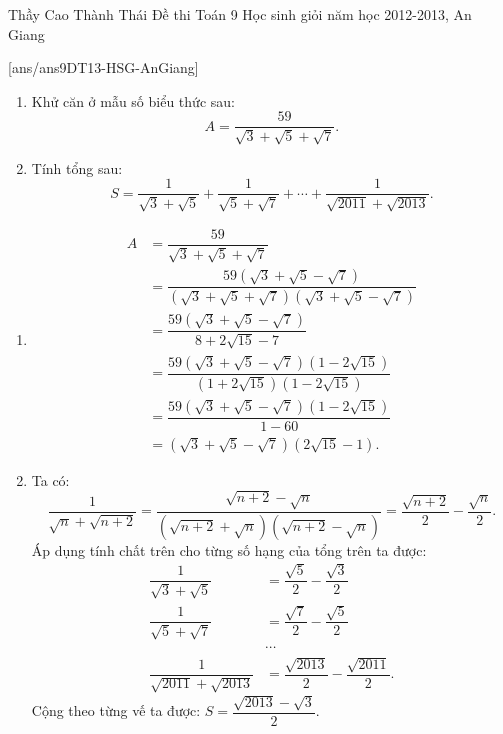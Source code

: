 \begin{name}
{Thầy Cao Thành Thái}
{Đề thi Toán 9 Học sinh giỏi năm học 2012-2013, An Giang}
\end{name}
\setcounter{ex}{0}
[ans/ans9DT13-HSG-AnGiang]


\begin{ex}%
\textrm{}
 \begin{enumerate}
  \item Khử căn ở mẫu số biểu thức sau:
  $$A = \dfrac{59}{\sqrt{3} + \sqrt{5} + \sqrt{7}}.$$
  \item Tính tổng sau:
  $$S = \dfrac{1}{\sqrt{3} + \sqrt{5}} + \dfrac{1}{\sqrt{5} + \sqrt{7}} + \cdots + \dfrac{1}{\sqrt{2011} + \sqrt{2013}}.$$
 \end{enumerate}
 \loigiai
 {
 \begin{enumerate}
  \item \textrm{ }
  \begin{align*}
  A & = \dfrac{59}{\sqrt{3} + \sqrt{5} + \sqrt{7}} \\
    & = \dfrac{59 \left( \sqrt{3} + \sqrt{5} - \sqrt{7} \right)}{\left( \sqrt{3} + \sqrt{5} + \sqrt{7} \right) \left( \sqrt{3} + \sqrt{5} - \sqrt{7} \right)} \\
    & = \dfrac{59 \left( \sqrt{3} + \sqrt{5} - \sqrt{7} \right)}{8 + 2\sqrt{15} - 7} \\
    & = \dfrac{59 \left( \sqrt{3} + \sqrt{5} - \sqrt{7} \right) \left( 1 - 2\sqrt{15} \right)}{\left( 1 + 2\sqrt{15} \right) \left( 1 - 2\sqrt{15} \right)}\\
    & = \dfrac{59 \left( \sqrt{3} + \sqrt{5} - \sqrt{7} \right) \left( 1 - 2\sqrt{15} \right)}{1 - 60}\\
    & = \left( \sqrt{3} + \sqrt{5} - \sqrt{7} \right) \left( 2\sqrt{15} - 1 \right).
  \end{align*}
  
  \item Ta có:
  $$\dfrac{1}{\sqrt{n} + \sqrt{n+2}} = \dfrac{\sqrt{n+2} - \sqrt{n}}{\left( \sqrt{n+2} + \sqrt{n} \right) \left( \sqrt{n+2} - \sqrt{n} \right)} = \dfrac{\sqrt{n+2}}{2} - \dfrac{\sqrt{n}}{2}.$$
  Áp dụng tính chất trên cho từng số hạng của tổng trên ta được:
  \begin{align*}
   \dfrac{1}{\sqrt{3} + \sqrt{5}} & = \dfrac{\sqrt{5}}{2} - \dfrac{\sqrt{3}}{2} \\
   \dfrac{1}{\sqrt{5} + \sqrt{7}} & = \dfrac{\sqrt{7}}{2} - \dfrac{\sqrt{5}}{2} \\
   & \cdots \\
   \dfrac{1}{\sqrt{2011} + \sqrt{2013}} & = \dfrac{\sqrt{2013}}{2} - \dfrac{\sqrt{2011}}{2}.
  \end{align*}
  Cộng theo từng vế ta được: $S = \dfrac{\sqrt{2013} - \sqrt{3}}{2}$.
 \end{enumerate}
 
 }
\end{ex}


